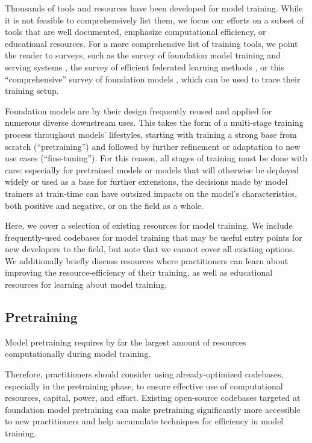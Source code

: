 
Thousands of tools and resources have been developed for model training. While it is not feasible to comprehensively list them, we focus our efforts on a subset of tools that are well documented, emphasize computational efficiency, or educational resources.
For a more comprehensive list of training tools, we point the reader to surveys, such as the survey of foundation model training and serving systems \citep{zhou2024training}, the survey of efficient federated learning methods \citep{woisetschlager2024survey}, or this ``comprehensive'' survey of foundation models \citep{zhou2023comprehensive}, which can be used to trace their training setup.

Foundation models are by their design frequently reused and applied for numerous diverse downstream uses. This takes the form of a multi-stage training process throughout models' lifestyles, starting with training a strong base from scratch (``pretraining'') and followed by further refinement or adaptation to new use cases (``fine-tuning''). For this reason, all stages of training must be done with care: especially for pretrained models or models that will otherwise be deployed widely or used as a base for further extensions, the decisions made by model trainers at train-time can have outsized impacts on the model's characteristics, both positive and negative, or on the field as a whole. 

Here, we cover a selection of existing resources for model training. We include frequently-used codebases for model training that may be useful entry points for new developers to the field, but note that we cannot cover all existing options. We additionally briefly discuss resources where practitioners can learn about improving the resource-efficiency of their training, as well as educational resources for learning about model training.

\subsection{Pretraining}\label{sec:pretrain-repo}

Model pretraining requires by far the largest amount of resources computationally during model training.

Therefore, practitioners should consider using already-optimized codebases, especially in the pretraining phase, to ensure effective use of computational resources, capital, power, and effort. Existing open-source codebases targeted at foundation model pretraining can make pretraining significantly more accessible to new practitioners and help accumulate techniques for efficiency in model training.

